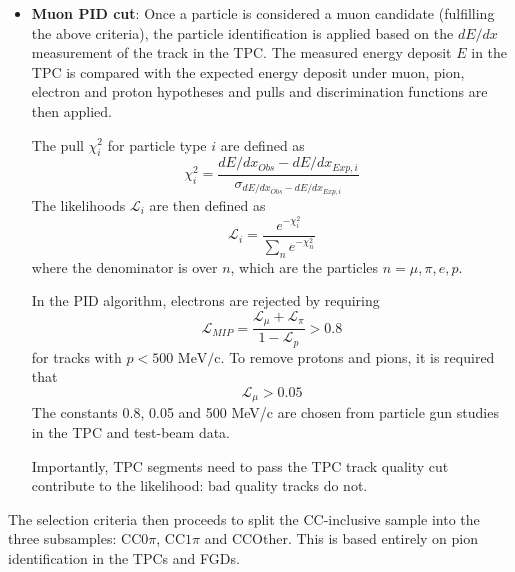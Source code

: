 \begin{itemize}
	\item \textbf{Muon PID cut}: Once a particle is considered a muon candidate (fulfilling the above criteria), the particle identification is applied based on the $dE/dx$ measurement of the track in the TPC. The measured energy deposit $E$ in the TPC is compared with the expected energy deposit under muon, pion, electron and proton hypotheses and pulls and discrimination functions are then applied.
	
	The pull $\chi^2_i$ for particle type $i$ are defined as
	\begin{equation}
	\label{eq:tpc_track_chi2}
	\chi^2_i = \frac{dE/dx_{Obs} - dE/dx_{Exp, i}}{\sigma_{dE/dx_{Obs} - dE/dx_{Exp, i}}}
	\end{equation}
	The likelihoods $\mathcal{L}_i$ are then defined as
	\begin{equation}
	\label{eq:tpc_track_likelihood}
		\mathcal{L}_i = \frac{e^{-\chi^2_i}}{\sum_n e^{-\chi^2_n}}
	\end{equation}
	where the denominator is over $n$, which are the particles $n=\mu,\pi,e,p$. 
	
	In the PID algorithm, electrons are rejected by requiring
	\begin{equation}
		\label{eq:tpc_track_mip}
		\mathcal{L}_{MIP} = \frac{\mathcal{L}_\mu + \mathcal{L}_\pi}{1-\mathcal{L}_p} > 0.8
	\end{equation}
	for tracks with $p<500\text{ MeV/c}$. To remove protons and pions, it is required that
	\begin{equation}
	\label{eq:tpc_track_mu}
		\mathcal{L}_\mu > 0.05
	\end{equation}
	The constants 0.8, 0.05 and 500 MeV/c are chosen from particle gun studies in the TPC and test-beam data.
	
	Importantly, TPC segments need to pass the TPC track quality cut contribute to the likelihood: bad quality tracks do not.
\end{itemize}

The selection criteria then proceeds to split the CC-inclusive sample into the three subsamples: CC$0\pi$, CC$1\pi$ and CCOther. This is based entirely on pion identification in the TPCs and FGDs.

